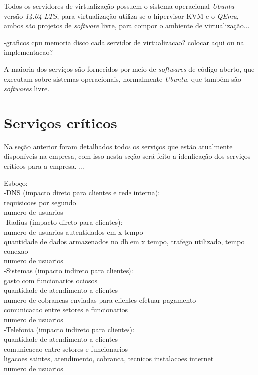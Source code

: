 Todos os servidores de virtualização possuem o sistema operacional \textit{Ubuntu} versão \textit{14.04 LTS}, para virtualização utiliza-se o 
hipervisor \ac{KVM} e o \textit{QEmu}, ambos são projetos de \textit{software} livre, para compor o ambiente de virtualização...

-graficos cpu memoria disco cada servidor de virtualizacao? colocar aqui ou na implementacao?

A maioria dos serviços são fornecidos por meio de \textit{softwares} de código aberto, que executam sobre sistemas operacionais, normalmente 
\textit{Ubuntu}, que também são \textit{softwares} livre.

\section{Serviços críticos}
\label{section:servcrit}

Na seção anterior foram detalhados todos os serviços que estão atualmente disponíveis na empresa, com isso nesta seção será feito a idenficação
dos serviços críticos para a empresa.
...

Esboço:\\
-DNS (impacto direto para clientes e rede interna): \\
requisicoes por segundo\\
numero de usuarios\\
-Radius (impacto direto para clientes): \\
numero de usuarios autentidados em x tempo\\
quantidade de dados armazenados no db em x tempo, trafego utilizado, tempo conexao\\
numero de usuarios\\
-Sistemas (impacto indireto para clientes): \\
gasto com funcionarios ociosos\\
quantidade de atendimento a clientes\\
numero de cobrancas enviadas para clientes efetuar pagamento\\
comunicacao entre setores e funcionarios\\
numero de usuarios\\
-Telefonia (impacto indireto para clientes): \\
quantidade de atendimento a clientes\\
comunicacao entre setores e funcionarios\\
ligacoes saintes, atendimento, cobranca, tecnicos instalacoes internet\\
numero de usuarios\\

